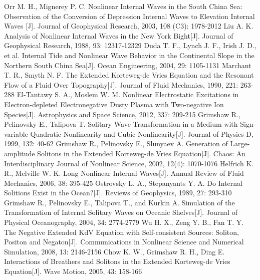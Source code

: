 \begin{thebibliography}{0}
 Orr M. H., Mignerey P. C. Nonlinear Internal Waves in the South China Sea: Observation of the Conversion of Depression Internal Waves to Elevation Internal Waves [J]. Journal of Geophysical Research, 2003, 108 (C3): 1978-2012
 Liu A. K. Analysis of Nonlinear Internal Waves in the New York Bight[J]. Journal of Geophysical Research, 1988, 93: 12317-12329
Duda T. F., Lynch J. F., Irish J. D., et al. Internal Tide and Nonlinear Wave Behavior in the Continental Slope in the Northern South China Sea[J]. Ocean Engineering, 2004, 29: 1105-1131 %
 Marchant T. R., Smyth N. F. The Extended Korteweg-de Vries Equation and the Resonant Flow of a Fluid Over Topography[J]. Journal of Fluid Mechanics, 1990, 221: 263-288%
 El-Tantawy S. A., Moslem W. M. Nonlinear Electrostatic Excitations in Electron-depleted Electronegative Dusty Plasma with Two-negative Ion Species[J]. Astrophysics and Space Science, 2012, 337: 209-215
 Grimshaw R., Pelinovsky E., Talipova T. Solitary Wave Transformation in a Medium with Sign-variable Quadratic Nonlinearity and Cubic Nonlinearity[J]. Journal of Physics D, 1999, 132: 40-62
 Grimshaw R., Pelinovsky E., Slunyaev A. Generation of Large-amplitude Solitons in the Extended Korteweg-de Vries Equation[J]. Chaos: An Interdisciplinary Journal of Nonlinear Science, 2002, 12(4): 1070-1076
 Helfrich K. R., Melville W. K. Long Nonlinear Internal Waves[J]. Annual Review of Fluid Mechanics, 2006, 38: 395-425%
 Ostrovsky L. A., Stepanyants Y. A. Do Internal Solitions Exist in the Ocean?[J]. Reviews of Geophysics, 1989, 27: 293-310%
 Grimshaw R., Pelinovsky E., Talipova T., and Kurkin A. Simulation of the Transformation of Internal Solitary Waves on Oceanic Shelves[J]. Journal of Physical Oceanography, 2004, 34: 2774-2779%
 Wu H. X., Zeng Y. B., Fan T. Y. The Negative Extended KdV Equation with Self-consistent Sources: Soliton, Positon and Negaton[J]. Communications in Nonlinear Science and Numerical Simulation, 2008, 13: 2146-2156
 Chow K. W., Grimshaw R. H., Ding E. Interactions of Breathers and Solitons in the Extended Korteweg-de Vries Equation[J]. Wave Motion, 2005, 43: 158-166%

\end{thebibliography}
